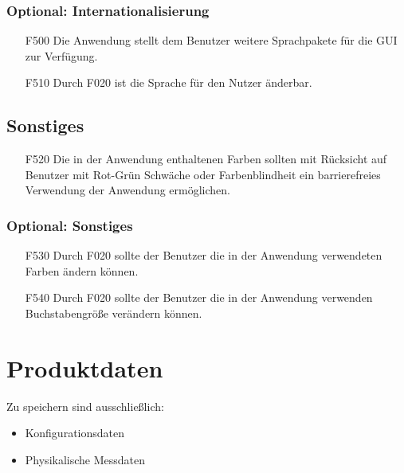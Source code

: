 \documentclass[parskip=full]{scrartcl}
\begin{document}
\subsubsection{Optional: Internationalisierung}

\begin{itemize}

\item[F500] Die Anwendung stellt dem Benutzer weitere Sprachpakete für die GUI zur Verfügung.
\item[F510] Durch F020 ist die Sprache für den Nutzer änderbar.

\end{itemize}

\subsection{Sonstiges}

\begin{itemize}

\item[F520] Die in der Anwendung enthaltenen Farben sollten mit Rücksicht auf Benutzer mit Rot-Grün Schwäche oder Farbenblindheit ein barrierefreies Verwendung der Anwendung ermöglichen.

\end{itemize}

\subsubsection{Optional: Sonstiges}

\begin{itemize}

\item[F530] Durch F020 sollte der Benutzer die in der Anwendung verwendeten Farben ändern können.
\item[F540] Durch F020 sollte der Benutzer die in der Anwendung verwenden Buchstabengröße verändern können.

\end{itemize}

\section{Produktdaten}\label{produktdaten}

Zu speichern sind ausschließlich:

\begin{itemize}

\item Konfigurationsdaten
\item Physikalische Messdaten

\end{itemize}
\end{document}
